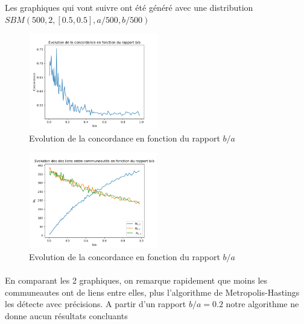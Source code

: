 \subsubsection{}
\paragraph*{}
Les graphiques qui vont suivre ont été généré avec une distribution
 $SBM(500,2,[0.5,0.5],a/500,b/500)$
\begin{figure}[H]
    \centering
    \includegraphics[width=0.5\textwidth]{figs/concordance_a_b.png}
    \caption{Evolution de la concordance en fonction du rapport $b/a$}
\end{figure}
\begin{figure}[H]
    \centering
    \includegraphics[width=0.5\textwidth]{figs/nij.png}
    \caption{Evolution de la concordance en fonction du rapport $b/a$}
\end{figure}

\paragraph*{}
En comparant les 2 graphiques, on remarque rapidement que moins les communeautes
ont de liens entre elles, plus l'algorithme de Metropolis-Hastings les détecte avec 
précisions. A partir d'un rapport $b/a = 0.2 $ notre algorithme ne donne aucun
résultats concluants

\subsubsection{}
